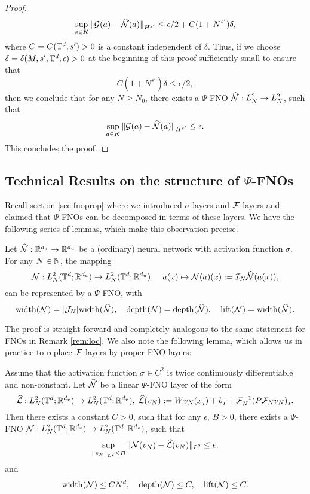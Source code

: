 \documentclass[reqno,a4paper]{amsart}
\begin{document}
\begin{proof}
\[
\sup_{a \in K} \Vert \mathcal{G}(a) - \widehat{\mathcal{N}}(a) \Vert_{H^{s'}}
\le
\epsilon/2 + 
C(1 + N^{s'}) \delta,
\]
where $C = C(\mathbb{T}^d,s') > 0$ is a constant independent of $\delta$. 
Thus, if we choose $\delta = \delta(M,s',\mathbb{T}^d,\epsilon)>0$ at the beginning of this proof sufficiently small to ensure that 
\[
C(1 + N^{s'}) \delta \le \epsilon/2,
\]
then we conclude that for any $N\ge N_0$, there exists a $\Psi$-FNO $\widehat{\mathcal{N}}: L^2_N \to L^2_N$, such that 
\[
\sup_{a \in K} \Vert \mathcal{G}(a) - \widehat{\mathcal{N}}(a) \Vert_{H^{s'}}
\le
\epsilon.
\]
This concludes the proof.
\end{proof}


\subsection{Technical Results on the structure of {$\Psi$}-FNOs}
\label{app:fnoprop}
Recall section \ref{sec:fnoprop} where we introduced $\sigma$ layers and $\mathcal{F}$-layers and claimed that $\Psi$-FNOs can be decomposed in terms of these layers. We have the following series of lemmas, which make this observation precise.
\begin{lemma} \label{lem:sigma}
Let $\widehat{\mathcal{N}}: \mathbb{R}^{d_a} \to \mathbb{R}^{d_u}$ be a (ordinary) neural network with activation function $\sigma$. For any $N\in \mathbb{N}$, the mapping
\[
\mathcal{N}: L^2_N(\mathbb{T}^d;\mathbb{R}^{d_a}) \to L^2_N(\mathbb{T}^d;\mathbb{R}^{d_u}),
\quad
a(x) \mapsto \mathcal{N}(a)(x) := \mathcal{I}_N\widehat{\mathcal{N}}(a(x)),
\]
can be represented by a $\Psi$-FNO, with 
\[
\mathrm{width}(\mathcal{N}) = |\mathcal{J}_N| \mathrm{width}(\widehat{\mathcal{N}}),
\quad
\mathrm{depth}(\mathcal{N}) = \mathrm{depth}(\widehat{\mathcal{N}}),
\quad
\mathrm{lift}(\mathcal{N}) = \mathrm{width}(\widehat{\mathcal{N}}).
\]
\end{lemma}

The proof is straight-forward and completely analogous to the same statement for FNOs in Remark \ref{rem:loc}.  We also note the following lemma, which allows us in practice to replace $\mathcal{F}$-layers by proper FNO layers:
\begin{lemma}
\label{lem:linear}
Assume that the activation function $\sigma \in C^2$ is twice continuously differentiable and non-constant. Let $\widehat{\mathcal{N}}$ be a linear $\Psi$-FNO layer of the form
\[
\widehat{\mathcal{L}}: L^2_N(\mathbb{T}^d;\mathbb{R}^{d_v}) \to L^2_N(\mathbb{T}^d;\mathbb{R}^{d_v}), \; \widehat{\mathcal{L}}(v_N) := Wv_N(x_j) + b_j + \mathcal{F}_N^{-1}(P\mathcal{F}_Nv_N)_j.
\]
Then there exists a constant $C>0$, such that for any $\epsilon, \, B>0$, there exists a $\Psi$-FNO $\mathcal{N}: L^2_N(\mathbb{T}^d;\mathbb{R}^{d_v}) \to L^2_N(\mathbb{T}^d;\mathbb{R}^{d_v})$, such that 
\[
\sup_{\Vert v_N \Vert_{L^2} \le B} 
\Vert \mathcal{N}(v_N) - \widehat{\mathcal{L}}(v_N) \Vert_{L^2} \le \epsilon,
\]
and
\[
\mathrm{width}(\mathcal{N}) \le CN^d,
\quad
\mathrm{depth}(\mathcal{N}) \le C, 
\quad
\mathrm{lift}(\mathcal{N}) \le C.
\]
\end{lemma}
\end{document}
